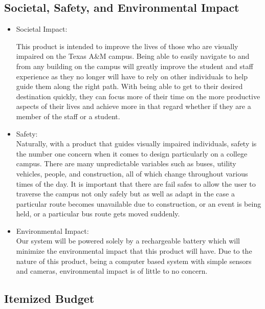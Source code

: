 \documentclass[letterpaper,12pt]{article}
\begin{document}
\subsection{Societal, Safety, and Environmental Impact}
\begin{itemize}
    \item Societal Impact: 

This product is intended to improve the lives of those who are visually impaired on the Texas A\&M campus. Being able to easily navigate to and from any building on the campus will greatly improve the student and staff experience as they no longer will have to rely on other individuals to help guide them along the right path. With being able to get to their desired destination quickly, they can focus more of their time on the more productive aspects of their lives and achieve more in that regard whether if they are a member of the staff or a student. \par

    \item Safety: \\
Naturally, with a product that guides visually impaired individuals, safety is the number one concern when it comes to design particularly on a college campus. There are many unpredictable variables such as buses, utility vehicles, people, and construction, all of which change throughout various times of the day. It is important that there are fail safes to allow the user to traverse the campus not only safely but as well as adapt in the case a particular route becomes unavailable due to construction, or an event is being held, or a particular bus route gets moved suddenly. \par

    \item Environmental Impact: \\
Our system will be powered solely by a rechargeable battery which will minimize the environmental impact that this product will have. Due to the nature of this product, being a computer based system with simple sensors and cameras, environmental impact is of little to no concern. \\


\end{itemize}
\subsection{Itemized Budget}
\end{document}
